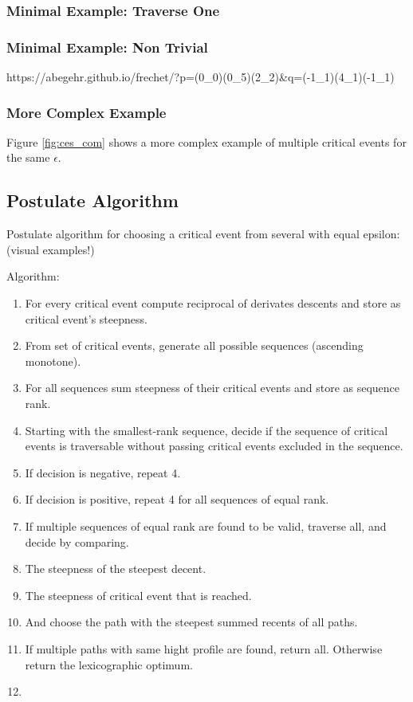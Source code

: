 \subsubsection{Minimal Example: Traverse One}


\subsubsection{Minimal Example: Non Trivial}
https://abegehr.github.io/frechet/?p=(0_0)(0_5)(2_2)&q=(-1_1)(4_1)(-1_1)


\subsubsection{More Complex Example}

Figure \ref{fig:ces_com} shows a more complex example of multiple critical events for the same $\epsilon$. 



\subsection{Postulate Algorithm}
Postulate algorithm for choosing a critical event from several with equal epsilon: (visual examples!)

Algorithm:
\begin{enumerate}
	\item For every critical event compute reciprocal of derivates descents and store as critical event's steepness.
	\item From set of critical events, generate all possible sequences (ascending monotone).
	\item For all sequences sum steepness of their critical events and store as sequence rank.
	\item Starting with the smallest-rank sequence, decide if the sequence of critical events is traversable without passing critical events excluded in the sequence.
	\item If decision is negative, repeat 4.
	\item If decision is positive, repeat 4 for all sequences of equal rank.
	\item If multiple sequences of equal rank are found to be valid, traverse all, and decide by comparing.
	\item The steepness of the steepest decent.
	\item The steepness of critical event that is reached.
	\item And choose the path with the steepest summed recents of all paths.
	\item If multiple paths with same hight profile are found, return all. Otherwise return the lexicographic optimum.
	\item 
\end{enumerate}

